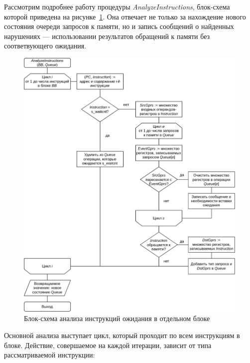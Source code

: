 \documentclass[a4paper,14pt]{extarticle}
\begin{document}
{Рассмотрим подробнее работу процедуры \textit{AnalyzeInstructions}, блок-схема которой приведена
на рисунке~\ref{fig:diagram-waitcnt-analyze}. Она отвечает не только за нахождение нового состояния
очереди запросов к памяти, но и запись сообщений о найденных нарушениях — использовании результатов
обращений к памяти без соответвующего ожидания.

\begin{figure}[H]
\centering
\includegraphics[width=\textwidth]{diagrams/alg-waitcnt-analyze}
\caption{Блок-схема анализа инструкций ожидания в отдельном блоке}
\label{fig:diagram-waitcnt-analyze}
\end{figure}

Основной анализа выступает цикл, который проходит по всем инструкциям в блоке. Действие, совершаемое
на каждой итерации, зависит от типа рассматриваемой инструкции:

}
\end{document}

